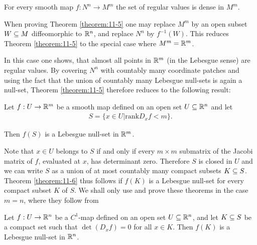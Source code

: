 \begin{theorem}\label{theorem:11-5}
  For every smooth map $f: N^n \to M^m$ the set of regular values is dense in $M^m$.
\end{theorem}

When proving Theorem \ref{theorem:11-5} one may replace $M^m$ by an open subset $W\subseteq M$
diffeomorphic to $\mathbb{R}^n$, and replace $N^n$ by $f^{-1}(W)$. This reduces Theorem \ref{theorem:11-5}
to the special case where $M^m = \mathbb{R}^m$.

In this case one shows, that almost all points in $\mathbb{R}^m$ (in the Lebesgue sense) are
regular values. By covering $N^n$ with countably many coordinate patches and
using the fact that the union of countably many Lebesgue null-sets is again a
null-set, Theorem \ref{theorem:11-5} therefore reduces to the following result:

\begin{theorem}[Sard, 1942]\label{theorem:11-6}
  Let $f:U\to\mathbb{R}^m$ be a smooth map defined on an open set $U\subseteq\mathbb{R}^n$ and let
  \begin{align*}
    S = \{x\in U\big| \text{rank} D_xf < m\}.
  \end{align*}

  Then $f(S)$ is a Lebesgue null-set in $\mathbb{R}^m$.
\end{theorem}

Note that $x\in U$ belongs to $S$ if and only if every $m\times m$ submatrix of the Jacobi
matrix of $f$, evaluated at $x$, has determinant zero. Therefore $S$ is closed in $U$ and
we can write $S$ as a union of at most countably many compact subsets $K\subseteq S$.
Theorem \ref{theorem:11-6} thus follows if $f(K)$ is a Lebesgue null-set for every compact
subset $K$ of $S$. We shall only use and prove these theorems in the case $m = n$,
where they follow from

\begin{proposition}\label{prop:11-7}
  Let $f:U\to \mathbb{R}^n$ be a $C^1$-map defined on an open set $U\subseteq \mathbb{R}^n$,
and let $K\subseteq S$ be a compact set such that $\det(D_xf) = 0$ for all $x\in K$. Then
$f(K)$ is a Lebesgue null-set in $\mathbb{R}^n$.
\end{proposition}

